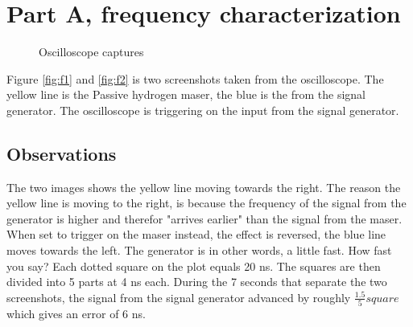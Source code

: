 \documentclass[11pt,english,a4paper]{article}
\begin{document}
\section{Part A, frequency characterization}
\begin{figure}[!htb]
  \centering
  \hfill
  \caption{Oscilloscope captures}
\end{figure}
Figure \ref{fig:f1} and \ref{fig:f2} is two screenshots taken from the oscilloscope. The yellow line is the Passive hydrogen maser, the blue is the from the signal generator. The oscilloscope is triggering on the input from the signal generator. 

\subsection{Observations}
The two images shows the yellow line moving towards the right. The reason the yellow line is moving to the right, is because the frequency of the signal from the generator is higher and therefor "arrives earlier" than the signal from the maser. When set to trigger on the maser instead, the effect is reversed, the blue line moves towards the left. The generator is in other words, a little fast. How fast you say? Each dotted square on the plot equals 20 ns. The squares are then divided into 5 parts at 4 ns each. During the 7 seconds that separate the two screenshots, the signal from the signal generator advanced by roughly $\frac{1.5}{5}square$  which gives an error of 6 ns. 
\end{document}
